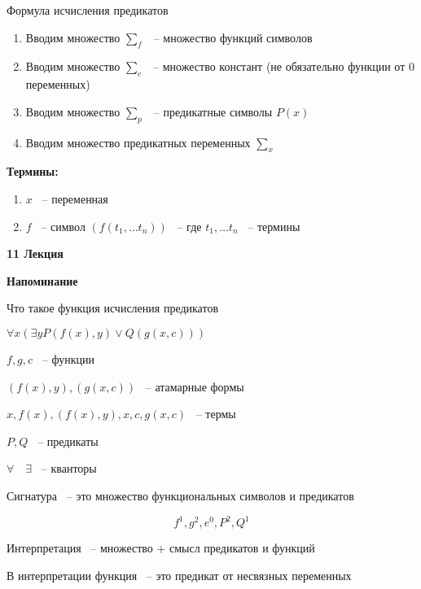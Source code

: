 \documentclass[russian]{lecture-notes}
\begin{document}
\begin{definition}
	Формула исчисления предикатов
	
	\begin{enumerate}
		\item{
			Вводим множество $\sum_f$ ~-- множество функций символов		
		}
		\item{
			Вводим множество $\sum_c$ ~-- множество констант (не обязательно функции от 0 переменных)		
		}		
		\item{
			Вводим множество $\sum_p$ ~-- предикатные символы $P(x)$			
		}
		\item{
				Вводим множество предикатных переменных $\sum_x$
		}			
	\end{enumerate}
	
	\textbf{Термины:}
	
	\begin{enumerate}
		\item $x$ ~-- переменная
		\item{
			$f$ ~-- символ $(f(t_1, \dots t_n))$ ~-- где $t_1, \dots t_n$ ~-- термины		
		}
	\end{enumerate}
\end{definition}



	\textbf{11 Лекция}
	
	\textbf{Напоминание}
	
	Что такое функция исчисления предикатов
	
	$\forall x (\exists y P(f(x), y) \lor Q(g(x, c)))$
	
	$f, g, c$ ~-- функции
	
	$(f(x), y), (g(x, c))$ ~-- атамарные формы
	
	$x, f(x), (f(x),y), x, c, g(x, c)$ ~-- термы
	
	$P, Q$ ~-- предикаты
	
	$\forall \quad \exists$ ~-- кванторы
	
\begin{definition}
	Сигнатура ~-- это множество функциональных символов и предикатов
	
	$${ f^1, g^2, e^0, P^2, Q^1}$$
\end{definition}

\begin{definition}
	Интерпретация ~-- множество + смысл предикатов и функций
\end{definition}

	В интерпретации функция ~-- это предикат от несвязных переменных
\end{document}
